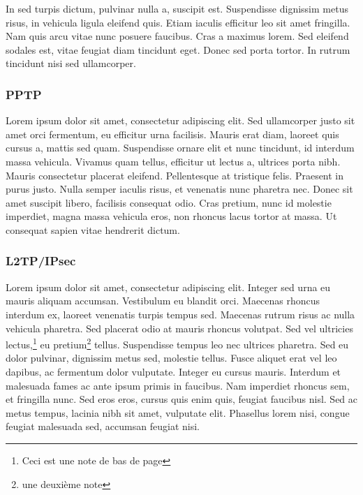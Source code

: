 \documentclass[a4paper,12pt]{report}
\begin{document}
In sed turpis dictum, pulvinar nulla a, suscipit est. Suspendisse dignissim metus risus, in vehicula ligula eleifend quis. Etiam iaculis efficitur leo sit amet fringilla. Nam quis arcu vitae nunc posuere faucibus. Cras a maximus lorem. Sed eleifend sodales est, vitae feugiat diam tincidunt eget. Donec sed porta tortor. In rutrum tincidunt nisi sed ullamcorper.

\subsubsection{PPTP} %
Lorem ipsum dolor sit amet, consectetur adipiscing elit. Sed ullamcorper justo sit amet orci fermentum, eu efficitur urna facilisis. Mauris erat diam, laoreet quis cursus a, mattis sed quam. Suspendisse ornare elit et nunc tincidunt, id interdum massa vehicula. Vivamus quam tellus, efficitur ut lectus a, ultrices porta nibh. Mauris consectetur placerat eleifend. Pellentesque at tristique felis. Praesent in purus justo. Nulla semper iaculis risus, et venenatis nunc pharetra nec. Donec sit amet suscipit libero, facilisis consequat odio. Cras pretium, nunc id molestie imperdiet, magna massa vehicula eros, non rhoncus lacus tortor at massa. Ut consequat sapien vitae hendrerit dictum.

\subsubsection{L2TP/IPsec} %
Lorem ipsum dolor sit amet, consectetur adipiscing elit. Integer sed urna eu mauris aliquam accumsan. Vestibulum eu blandit orci. Maecenas rhoncus interdum ex, laoreet venenatis turpis tempus sed. Maecenas rutrum risus ac nulla vehicula pharetra. Sed placerat odio at mauris rhoncus volutpat. Sed vel ultricies lectus,\footnote{Ceci est une note de bas de page } eu pretium\footnote{une deuxième note }  tellus. Suspendisse tempus leo nec ultrices pharetra. Sed eu dolor pulvinar, dignissim metus sed, molestie tellus. Fusce aliquet erat vel leo dapibus, ac fermentum dolor vulputate. Integer eu cursus mauris. Interdum et malesuada fames ac ante ipsum primis in faucibus. Nam imperdiet rhoncus sem, et fringilla nunc. Sed eros eros, cursus quis enim quis, feugiat faucibus nisl. Sed ac metus tempus, lacinia nibh sit amet, vulputate elit. Phasellus lorem nisi, congue feugiat malesuada sed, accumsan feugiat nisi.
\end{document}

